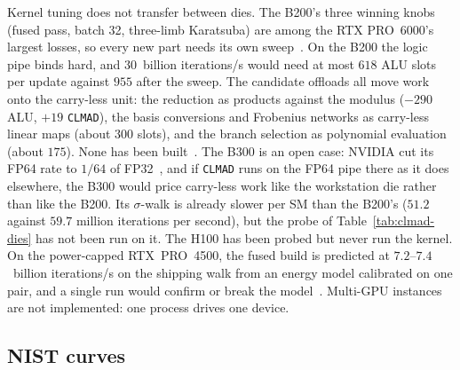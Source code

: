 Kernel tuning does not transfer between dies. The B200's three winning
knobs (fused pass, batch 32, three-limb Karatsuba) are among the RTX
PRO~6000's largest losses, so every new part needs its own
sweep~. On the B200 the logic pipe
binds hard, and $30$~billion iterations/s would need at most $618$ ALU
slots per update against $955$ after the sweep. The candidate offloads
all move work onto the carry-less unit: the reduction as products
against the modulus ($-290$ ALU, $+19$ \texttt{CLMAD}), the basis
conversions and Frobenius networks as carry-less linear maps (about
$300$ slots), and the branch selection as polynomial evaluation (about
$175$). None has been built~.
The B300 is an open case: NVIDIA cut its FP64 rate to $1/64$ of
FP32~\cite{aubrey2025blackwellultra}, and if \texttt{CLMAD} runs on the
FP64 pipe there as it does elsewhere, the B300 would price carry-less
work like the workstation die rather than like the B200. Its
$\sigma$-walk is already slower per SM than the B200's ($51.2$ against
$59.7$ million iterations per second), but the probe of
Table~\ref{tab:clmad-dies} has not been run on it. The H100 has been probed but never run the kernel. On the power-capped
RTX~PRO~4500, the fused build is predicted at $7.2$--$7.4$~billion
iterations/s on the shipping walk from an energy model calibrated on one
pair, and a single run would confirm or break the
model~. Multi-GPU instances are not
implemented: one process drives one device.

\subsection{NIST curves}
\label{sec:open-nist}

